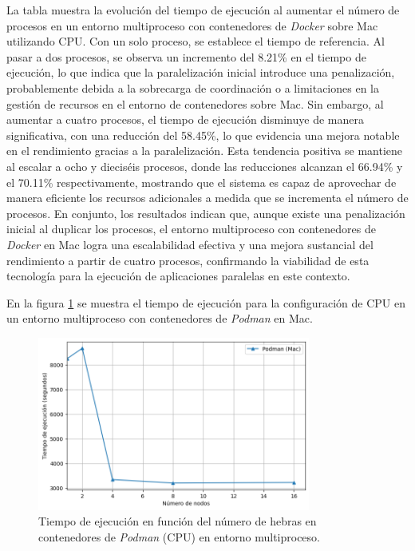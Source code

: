 La tabla muestra la evolución del tiempo de ejecución al aumentar el número de procesos en un entorno multiproceso con contenedores de \textit{Docker} sobre Mac utilizando CPU. Con un solo proceso, se establece el tiempo de referencia. Al pasar a dos procesos, se observa un incremento del 8.21\% en el tiempo de ejecución, lo que indica que la paralelización inicial introduce una penalización, probablemente debida a la sobrecarga de coordinación o a limitaciones en la gestión de recursos en el entorno de contenedores sobre Mac. Sin embargo, al aumentar a cuatro procesos, el tiempo de ejecución disminuye de manera significativa, con una reducción del 58.45\%, lo que evidencia una mejora notable en el rendimiento gracias a la paralelización. Esta tendencia positiva se mantiene al escalar a ocho y dieciséis procesos, donde las reducciones alcanzan el 66.94\% y el 70.11\% respectivamente, mostrando que el sistema es capaz de aprovechar de manera eficiente los recursos adicionales a medida que se incrementa el número de procesos. En conjunto, los resultados indican que, aunque existe una penalización inicial al duplicar los procesos, el entorno multiproceso con contenedores de \textit{Docker} en Mac logra una escalabilidad efectiva y una mejora sustancial del rendimiento a partir de cuatro procesos, confirmando la viabilidad de esta tecnología para la ejecución de aplicaciones paralelas en este contexto.

En la figura \ref{fig:multi-node_mac_podman_time} se muestra el tiempo de ejecución para la configuración de CPU en un entorno multiproceso con contenedores de \textit{Podman} en Mac.

\begin{figure}[H]
    \centering
    \includegraphics[width=0.8\textwidth]{imagenes/cap5/multi-node_mac_podman_time.png}
    \caption{Tiempo de ejecución en función del número de hebras en contenedores de \textit{Podman} (CPU) en entorno multiproceso.}
    \label{fig:multi-node_mac_podman_time}
\end{figure}

